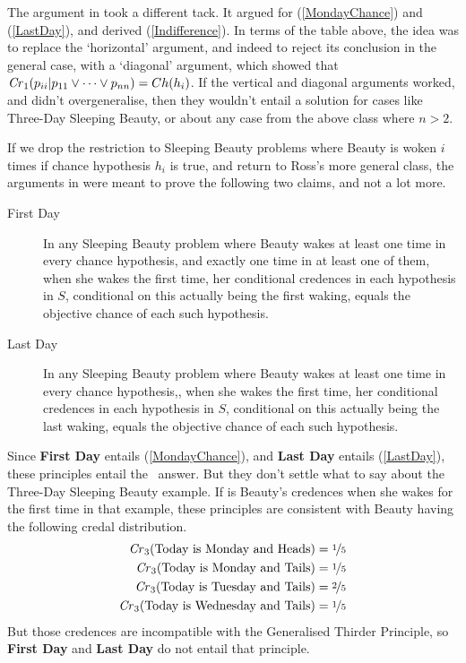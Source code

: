 The argument in \citet{Weatherson-SoSB} took a different tack. It argued for (\ref{MondayChance}) and (\ref{LastDay}), and derived (\ref{Indifference}). In terms of the table above, the idea was to replace the `horizontal' argument, and indeed to reject its conclusion in the general case, with a `diagonal' argument, which showed that $\text{\textit{Cr}}_1(p_{ii} | p_{11} \vee \dots \vee p_{nn}) = Ch(h_i)$. If the vertical and diagonal arguments worked, and didn't overgeneralise, then they wouldn't entail a solution for  cases like Three-Day Sleeping Beauty, or about any case from the above class where $n > 2$. 

If we drop the restriction to Sleeping Beauty problems where Beauty is woken $i$ times if chance hypothesis $h_i$ is true, and return to Ross's more general class, the arguments in \citet{Weatherson-SoSB} were meant to prove the following two claims, and not a lot more.

\begin{description}
\item[First Day] In any Sleeping Beauty problem where Beauty wakes at least one time in every chance hypothesis, and exactly one time in at least one of them, when she wakes the first time, her conditional credences in each hypothesis in $S$, conditional on this actually being the first waking, equals the objective chance of each such hypothesis.
\item[Last Day] In any Sleeping Beauty problem where Beauty wakes at least one time in every chance hypothesis,, when she wakes the first time, her conditional credences in each hypothesis in $S$, conditional on this actually being the last waking, equals the objective chance of each such hypothesis.
\end{description}

\noindent Since \textbf{First Day} entails (\ref{MondayChance}), and \textbf{Last Day} entails (\ref{LastDay}), these principles entail the \third\ answer. But they don't settle what to say about the Three-Day Sleeping Beauty example. If  is Beauty's credences when she wakes for the first time in that example, these principles are consistent with Beauty having the following credal distribution.
\begin{align}
\text{\textit{Cr}}_3(\text{Today is Monday and Heads}) &= \nicefrac{1}{5} \\
\text{\textit{Cr}}_3(\text{Today is Monday and Tails}) &= \nicefrac{1}{5} \\
\text{\textit{Cr}}_3(\text{Today is Tuesday and Tails}) &= \nicefrac{2}{5} \\
\text{\textit{Cr}}_3(\text{Today is Wednesday and Tails}) &= \nicefrac{1}{5} 
\end{align} 
But those credences are incompatible with the Generalised Thirder Principle, so \textbf{First Day} and \textbf{Last Day} do not entail that principle.

